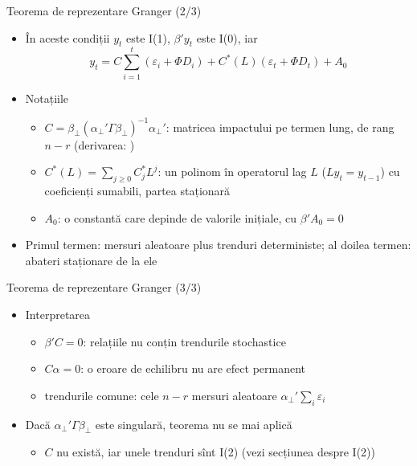 \begin{frame}{Teorema de reprezentare Granger (2/3)}
\itemsize{\small}
\begin{itemize}
    \item În aceste condiții $y_t$ este I(1), $\beta'y_t$ este I(0), iar \[ y_t = C\sum_{i=1}^{t}(\varepsilon_i + \Phi D_i) + C^*(L)(\varepsilon_t + \Phi D_t) + A_0 \]
    \item Notațiile
    \begin{itemize}
        \item $C = \beta_\perp(\alpha_\perp'\Gamma\beta_\perp)^{-1}\alpha_\perp'$: matricea impactului pe termen lung, de rang $n - r$ (derivarea: )  %
        \item $C^*(L) = \sum_{j\ge 0}C_j^*L^j$: un polinom în operatorul lag $L$ ($Ly_t = y_{t-1}$) cu coeficienți sumabili, partea staționară
        \item $A_0$: o constantă care depinde de valorile inițiale, cu $\beta'A_0 = 0$
    \end{itemize}
    \item Primul termen: mersuri aleatoare plus trenduri deterministe; al doilea termen: abateri staționare de la ele
\end{itemize}
\end{frame}

\begin{frame}{Teorema de reprezentare Granger (3/3)}
\itemsize{\small}
\begin{itemize}
    \item Interpretarea
    \begin{itemize}
        \item $\beta'C = 0$: relațiile nu conțin trendurile stochastice
        \item $C\alpha = 0$: o eroare de echilibru nu are efect permanent
        \item trendurile comune: cele $n - r$ mersuri aleatoare $\alpha_\perp'\sum_i\varepsilon_i$
    \end{itemize}
    \item Dacă $\alpha_\perp'\Gamma\beta_\perp$ este singulară, teorema nu se mai aplică
    \begin{itemize}
        \item $C$ nu există, iar unele trenduri sînt I(2) (vezi secțiunea despre I(2))
    \end{itemize}
\end{itemize}
\end{frame}


